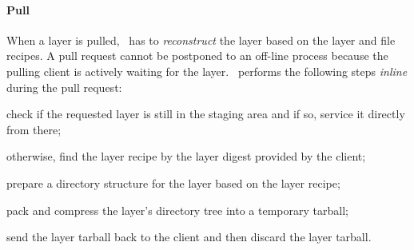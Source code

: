 \paragraph{Pull}
%
When a layer is pulled, \sysname\ has to \emph{reconstruct} the layer based
on the layer and file recipes.
%
A pull request cannot be postponed to an off-line process because the
pulling client is actively waiting for the layer.
%
\sysname\ performs the following steps \emph{inline} during the pull request:
%
\begin{compactenumerate}
  \item check if the requested layer is still in the staging area and if so,
	service it directly from there;
  \item otherwise, find the layer recipe by the layer digest
	provided by the client;
  \item prepare a directory structure for the layer based on the layer recipe;
  \item pack and compress the layer's directory tree into a temporary tarball;
  \item send the layer tarball back to the client and then discard the layer tarball.
\end{compactenumerate}

